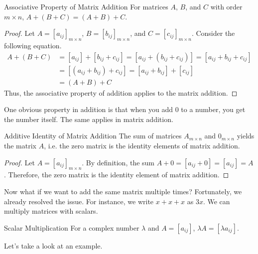 \documentclass[../main.tex]{subfiles}
\begin{document}
\begin{theorem}{Associative Property of Matrix Addition}
For matrices $A$, $B$, and $C$ with order $m \times n$,
$A + (B + C) = (A + B) + C$.
\end{theorem}
\begin{proof}
Let $A = [a_{ij}]_{m \times n}$, $B = [b_{ij}]_{m \times n}$,
and $C = [c_{ij}]_{m \times n}$. Consider the following equation.
\begin{align*}
    A + (B + C)
    &= [a_{ij}] + [b_{ij} + c_{ij}]
     = [a_{ij} + (b_{ij} + c_{ij})]
     = [a_{ij} + b_{ij} + c_{ij}] \\
    &= [(a_{ij} + b_{ij}) + c_{ij}]
     = [a_{ij} + b_{ij}] + [c_{ij}] \\
    &= (A + B) + C
\end{align*}
Thus, the associative property of addition applies to the matrix
addition.
\end{proof}

One obvious property in addition is that when you add $0$ to a number,
you get the number itself. The same applies in matrix addition.

\begin{theorem}{Additive Identity of Matrix Addition}
The sum of matrices $A_{m \times n}$ and $0_{m \times n}$ yields
the matrix $A$, i.e. the zero matrix is the identity elements of
matrix addition.
\end{theorem}
\begin{proof}
Let $A = [a_{ij}]_{m \times n}$. By definition, the sum $A + 0
= [a_{ij} + 0] = [a_{ij}] = A$. Therefore, the zero matrix is the
identity element of matrix addition.
\end{proof}

Now what if we want to add the same matrix multiple times?
Fortunately, we already resolved the issue. For instance,
we write $x + x + x$ as $3x$. We can multiply matrices with scalars.

\begin{theorem}{Scalar Multiplication}
For a complex number $\lambda$ and $A = [a_{ij}]$, $\lambda A
= [\lambda a_{ij}]$.
\end{theorem}

Let's take a look at an example.
\end{document}
